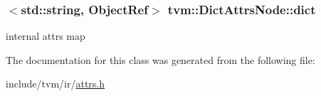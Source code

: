 \subsubsection[{\texorpdfstring{dict}{dict}}]{$<$std\+::string, Object\+Ref$>$ tvm\+::\+Dict\+Attrs\+Node\+::dict}\hypertarget{classtvm_1_1DictAttrsNode_a84b24dd355be6b65a0748d4b4e02feed}{}\label{classtvm_1_1DictAttrsNode_a84b24dd355be6b65a0748d4b4e02feed}


internal attrs map 



The documentation for this class was generated from the following file\+:\begin{DoxyCompactItemize}
\item 
include/tvm/ir/\hyperlink{ir_2attrs_8h}{attrs.\+h}\end{DoxyCompactItemize}
